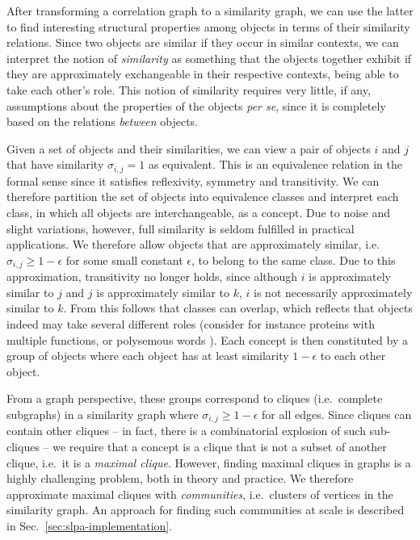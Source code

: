 \documentclass{kais}
\begin{document}
After transforming a correlation graph to a similarity graph, we can use the latter to find interesting
structural properties among objects in terms of their similarity relations. Since two objects are similar
if they occur in similar contexts, we can interpret the notion of \emph{similarity} as something that
the objects together exhibit if they are approximately exchangeable in their respective contexts,
being able to take each other's role. This notion of similarity  
requires very little, if any, assumptions about the properties of the objects \emph{per se}, since it is 
completely based on the relations \emph{between} objects.

Given a set of objects and their similarities, we can view a pair of objects $i$ and $j$ that have similarity
$\sigma_{i,j} = 1$ as equivalent. This is an equivalence relation in the formal sense
since it satisfies reflexivity, symmetry and transitivity. We can therefore partition the set of objects into
equivalence classes and interpret each class, in which all objects are interchangeable, as a concept.
Due to noise and slight variations, however, full similarity is seldom fulfilled in practical applications.
We therefore allow objects that are approximately similar,
i.e.~$\sigma_{i,j} \geq 1-\epsilon$ for some small constant $\epsilon$,
to belong to the same class. Due to this approximation, transitivity no longer holds, since although $i$ is approximately
similar to $j$ and $j$ is approximately similar to $k$, $i$ is not necessarily approximately similar to $k$.
From this follows that classes can overlap, which reflects that objects indeed may take several different roles
(consider for instance proteins with multiple functions, or polysemous words \cite{Palla2005}). 
Each concept is then constituted by a group of objects where each object has at least similarity $1-\epsilon$ to each other object. 

From a graph perspective, these
groups correspond to cliques (i.e.~complete subgraphs) in a similarity graph where $\sigma_{i,j} \geq 1-\epsilon$
for all edges. Since cliques can contain other cliques -- in fact, there is a combinatorial
explosion of such sub-cliques -- we require that a concept is a clique that is not a subset of another clique,
i.e.~it is a \emph{maximal clique}. However, finding maximal cliques in graphs is a highly challenging problem, both in theory
and practice. We therefore approximate maximal cliques with \emph{communities}, i.e.~clusters of vertices in the similarity graph. 
An approach for finding such communities at scale is described in Sec.~\ref{sec:slpa-implementation}.
\end{document}
